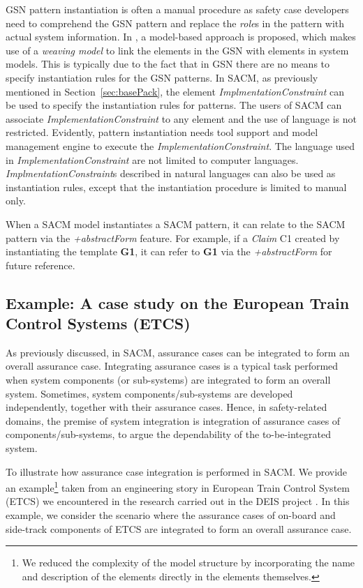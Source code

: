 GSN pattern instantiation is often a manual procedure as safety case developers need to comprehend the GSN pattern and replace the \textit{role}s in the pattern with actual system information. In \cite{hawkins2015weaving}, a model-based approach is proposed, which makes use of a \textit{weaving model} to link the elements in the GSN with elements in system models. This is typically due to the fact that in GSN there are no means to specify instantiation rules for the GSN patterns. In SACM, as previously mentioned in Section~\ref{sec:basePack}, the element \textit{ImplmentationConstraint} can be used to specify the instantiation rules for patterns. The users of SACM can associate \textit{ImplementationConstraint} to any element and the use of language is not restricted.
Evidently, pattern instantiation needs tool support and model management engine to execute the \textit{ImplementationConstraint}. The language used in \textit{ImplementationConstraint} are not limited to computer languages. \textit{ImplmentationConstraint}s described in natural languages can also be used as instantiation rules, except that the instantiation procedure is limited to manual only. 

When a SACM model instantiates a SACM pattern, it can relate to the SACM pattern via the \textit{+abstractForm} feature. For example, if a \textit{Claim} C1 created by instantiating the template \textbf{G1}, it can refer to \textbf{G1} via the \textit{+abstractForm} for future reference. 

\subsection{Example: A case study on the European Train Control Systems (ETCS)}
\label{section:etcs}
As previously discussed, in SACM, assurance cases can be integrated to form an overall assurance case. 
Integrating assurance cases is a typical task performed when system components (or sub-systems) are integrated to form an overall system. 
Sometimes, system components/sub-systems are developed independently, together with their assurance cases. 
Hence, in safety-related domains, the premise of system integration is integration of assurance cases of components/sub-systems, to argue the dependability of the to-be-integrated system.

To illustrate how assurance case integration is performed in SACM. We provide an example\footnote{We reduced the complexity of the model structure by incorporating the name and description of the elements directly in the elements themselves.} taken from an engineering story in European Train Control System (ETCS) we encountered  in the research carried out in the DEIS project \cite{wei2017deis}. In this example, we consider the scenario where the assurance cases of on-board and side-track components of ETCS are integrated to form an overall assurance case.
 
